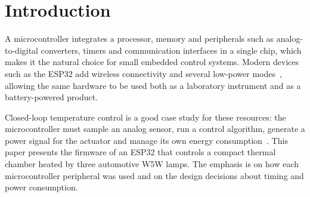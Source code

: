 \section{Introduction}

A microcontroller integrates a processor, memory and peripherals such as analog-to-digital
converters, timers and communication interfaces in a single chip, which makes it the natural
choice for small embedded control systems. Modern devices such as the ESP32 add wireless
connectivity and several low-power modes~\cite{esp32ds,esp32trm}, allowing the same hardware to be
used both as a laboratory instrument and as a battery-powered product.

Closed-loop temperature control is a good case study for these resources: the microcontroller
must sample an analog sensor, run a control algorithm, generate a power signal for the actuator and
manage its own energy consumption~\cite{ogata2010}. This paper presents the firmware of an ESP32
that controls a compact thermal chamber heated by three automotive W5W lamps. The emphasis is on
how each microcontroller peripheral was used and on the design decisions about timing and power
consumption.
